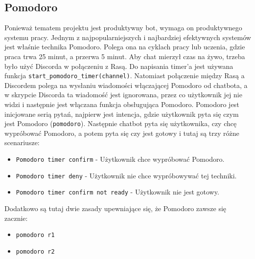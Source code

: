 \documentclass{article}
\begin{document}
\subsection{Pomodoro}
Ponieważ tematem projektu jest produktywny bot, wymaga on produktywnego systemu
pracy. Jednym z najpopularniejszych i najbardziej efektywnych systemów jest
właśnie technika Pomodoro. Polega ona na cyklach pracy lub uczenia, gdzie praca
trwa 25 minut, a przerwa 5 minut. Aby chat mierzył czas na żywo, trzeba było
użyć Discorda w połączeniu z Rasą. Do napisania timer'a jest używana funkcja
\verb|start_pomodoro_timer(channel)|. Natomiast połączenie między Rasą a
Discordem polega na wysłaniu wiadomości włączającej Pomodoro od chatbota, a w
skrypcie Discorda ta wiadomość jest ignorowana, przez co użytkownik jej nie
widzi i następnie jest włączana funkcja obsługująca Pomodoro. Pomodoro jest
inicjowane serią pytań, najpierw jest intencja, gdzie użytkownik pyta się czym
jest Pomodoro (\verb|pomodoro|). Następnie chatbot pyta się użytkownika, czy
chcę wypróbować Pomodoro, a potem pyta się czy jest gotowy i tutaj są trzy
różne scenariusze:
\begin{itemize}
    \item[\textcolor{violet}{\textbullet}] \verb|Pomodoro timer confirm| - Użytkownik chce wypróbować Pomodoro.
    \item[\textcolor{violet}{\textbullet}] \verb|Pomodoro timer deny| - Użytkownik nie chce wypróbowywać
        tej techniki.
    \item[\textcolor{violet}{\textbullet}] \verb|Pomodoro timer confirm not ready| - Użytkownik nie jest
        gotowy.
\end{itemize}
Dodatkowo są tutaj dwie zasady upewniające się, że Pomodoro zawsze się zacznie:
\begin{itemize}
    \item[\textcolor{violet}{\textbullet}] \verb|pomodoro r1|
    \item[\textcolor{violet}{\textbullet}] \verb|pomodoro r2|
\end{itemize}
\end{document}
